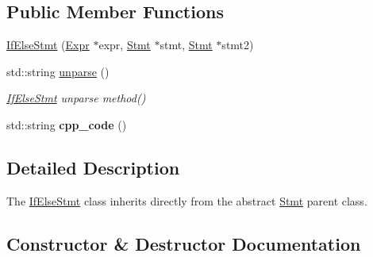 \subsection*{Public Member Functions}
\begin{DoxyCompactItemize}
\item 
\hyperlink{classfcal_1_1ast_1_1IfElseStmt_adf51b8907ed61b1608e5fe70824471e8}{If\+Else\+Stmt} (\hyperlink{classfcal_1_1ast_1_1Expr}{Expr} $\ast$expr, \hyperlink{classfcal_1_1ast_1_1Stmt}{Stmt} $\ast$stmt, \hyperlink{classfcal_1_1ast_1_1Stmt}{Stmt} $\ast$stmt2)
\item 
std\+::string \hyperlink{classfcal_1_1ast_1_1IfElseStmt_a58584903e7e9480773ca5be804342721}{unparse} ()
\begin{DoxyCompactList}\small\item\em \hyperlink{classfcal_1_1ast_1_1IfElseStmt}{If\+Else\+Stmt} unparse method() \end{DoxyCompactList}\item 
std\+::string {\bfseries cpp\+\_\+code} ()\hypertarget{classfcal_1_1ast_1_1IfElseStmt_a5339619d1f29800558f735cb6cb99681}{}\label{classfcal_1_1ast_1_1IfElseStmt_a5339619d1f29800558f735cb6cb99681}

\end{DoxyCompactItemize}


\subsection{Detailed Description}
The \hyperlink{classfcal_1_1ast_1_1IfElseStmt}{If\+Else\+Stmt} class inherits directly from the abstract \hyperlink{classfcal_1_1ast_1_1Stmt}{Stmt} parent class. 

\subsection{Constructor \& Destructor Documentation}
